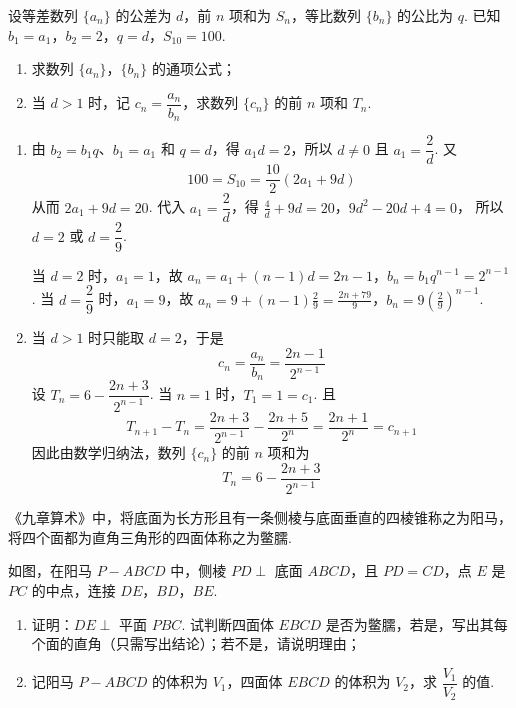 \begin{problem}
设等差数列 \(\{a_n\}\) 的公差为 \(d\)，前 \(n\) 项和为 \(S_n\)，等比数列 \(\{b_n\}\) 的公比为 \(q\). 已知 \(b_1=a_1\)，\(b_2=2\)，\(q=d\)，\(S_{10}=100\).

\begin{enumerate}
\item 求数列 \(\{a_n\}\)，\(\{b_n\}\) 的通项公式；
\item 当 \(d>1\) 时，记 \(c_n=\dfrac{a_n}{b_n}\)，求数列 \(\{c_n\}\) 的前 \(n\) 项和 \(T_n\).
\end{enumerate}
\end{problem}

\begin{solution}
\begin{enumerate}
\item 由 \(b_2=b_1q\)、\(b_1=a_1\) 和 \(q=d\)，得
\(a_1d=2\)，所以 \(d\neq0\) 且 \(a_1=\dfrac{2}{d}\). 又
\[
100=S_{10}=\frac{10}{2}\left(2a_1+9d\right)
\]
从而 \(2a_1+9d=20\). 代入 \(a_1=\dfrac{2}{d}\)，得
\(\frac{4}{d}+9d=20\)，\(9d^2-20d+4=0\)，
所以 \(d=2\) 或 \(d=\dfrac{2}{9}\).

当 \(d=2\) 时，\(a_1=1\)，故
\(a_n=a_1+(n-1)d=2n-1\)，\(b_n=b_1q^{n-1}=2^{n-1}\).
当 \(d=\dfrac{2}{9}\) 时，\(a_1=9\)，故
\(a_n=9+(n-1)\frac{2}{9}=\frac{2n+79}{9}\)，\(b_n=9\left(\frac{2}{9}\right)^{n-1}\).

\item 当 \(d>1\) 时只能取 \(d=2\)，于是
\[
c_n=\frac{a_n}{b_n}=\frac{2n-1}{2^{n-1}}
\]
设 \(T_n=6-\dfrac{2n+3}{2^{n-1}}\). 当 \(n=1\) 时，\(T_1=1=c_1\). 且
\[
T_{n+1}-T_n
=\frac{2n+3}{2^{n-1}}-\frac{2n+5}{2^n}
=\frac{2n+1}{2^n}=c_{n+1}
\]
因此由数学归纳法，数列 \(\{c_n\}\) 的前 \(n\) 项和为
\[
T_n=6-\frac{2n+3}{2^{n-1}}
\]
\end{enumerate}
\end{solution}

\begin{problem}
《九章算术》中，将底面为长方形且有一条侧棱与底面垂直的四棱锥称之为阳马，将四个面都为直角三角形的四面体称之为鳖臑.

如图，在阳马 \(P-ABCD\) 中，侧棱 \(PD\perp\) 底面 \(ABCD\)，且 \(PD=CD\)，点 \(E\) 是 \(PC\) 的中点，连接 \(DE\)，\(BD\)，\(BE\).

\begin{enumerate}
\item 证明：\(DE\perp\) 平面 \(PBC\). 试判断四面体 \(EBCD\) 是否为鳖臑，若是，写出其每个面的直角（只需写出结论）；若不是，请说明理由；
\item 记阳马 \(P-ABCD\) 的体积为 \(V_1\)，四面体 \(EBCD\) 的体积为 \(V_2\)，求 \(\dfrac{V_1}{V_2}\) 的值.
\end{enumerate}

\problemresetlayout
{}
\FloatBarrier
\end{problem}

